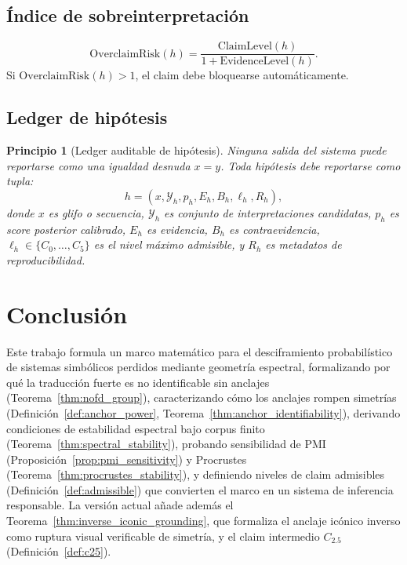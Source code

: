 \documentclass[11pt,a4paper]{article}
\newtheorem{principle}[theorem]{Principio}
\newcommand{\1}{\mathbf{1}}
\numberwithin{equation}{section}
\begin{document}
\subsection{Índice de sobreinterpretación}

\begin{equation}
    \mathrm{OverclaimRisk}(h)=\frac{\mathrm{ClaimLevel}(h)}{1+\mathrm{EvidenceLevel}(h)}.
\end{equation}
Si $\mathrm{OverclaimRisk}(h)>1$, el claim debe bloquearse automáticamente.

\subsection{Ledger de hipótesis}

\begin{principle}[Ledger auditable de hipótesis]
Ninguna salida del sistema puede reportarse como una igualdad desnuda $x=y$. Toda hipótesis debe reportarse como tupla:
\begin{equation}
    h=(x,\mathcal{Y}_h,p_h,E_h,B_h,\ell_h,R_h),
\end{equation}
donde $x$ es glifo o secuencia, $\mathcal{Y}_h$ es conjunto de interpretaciones candidatas, $p_h$ es score posterior calibrado, $E_h$ es evidencia, $B_h$ es contraevidencia, $\ell_h\in\{C_0,\dots,C_5\}$ es el nivel máximo admisible, y $R_h$ es metadatos de reproducibilidad.
\end{principle}

\section{Conclusión}

Este trabajo formula un marco matemático para el desciframiento probabilístico de sistemas simbólicos perdidos mediante geometría espectral, formalizando por qué la traducción fuerte es no identificable sin anclajes (Teorema~\ref{thm:nofd_group}), caracterizando cómo los anclajes rompen simetrías (Definición~\ref{def:anchor_power}, Teorema~\ref{thm:anchor_identifiability}), derivando condiciones de estabilidad espectral bajo corpus finito (Teorema~\ref{thm:spectral_stability}), probando sensibilidad de PMI (Proposición~\ref{prop:pmi_sensitivity}) y Procrustes (Teorema~\ref{thm:procrustes_stability}), y definiendo niveles de claim admisibles (Definición~\ref{def:admissible}) que convierten el marco en un sistema de inferencia responsable. La versión actual añade además el Teorema~\ref{thm:inverse_iconic_grounding}, que formaliza el anclaje icónico inverso como ruptura visual verificable de simetría, y el claim intermedio $C_{2.5}$ (Definición~\ref{def:c25}).
\end{document}
